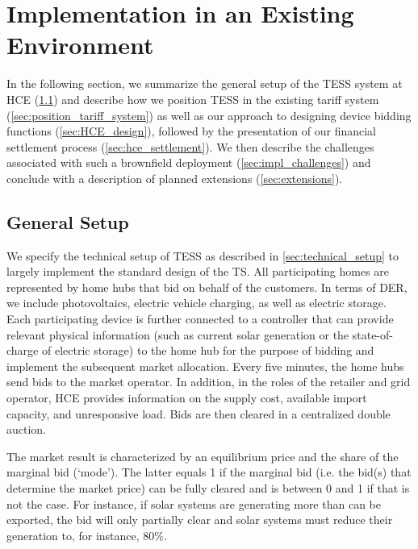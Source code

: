 \section{Implementation in an Existing Environment}\label{sec:challenges}

In the following section, we summarize the general setup of the TESS system at HCE (\cref{sec:hce_market_setup}) and describe how we position TESS in the existing tariff system (\cref{sec:position_tariff_system}) as well as our approach to designing device bidding functions (\cref{sec:HCE_design}), followed by the presentation of our financial settlement process (\cref{sec:hce_settlement}). We then describe the challenges associated with such a brownfield deployment (\cref{sec:impl_challenges}) and conclude with a description of planned extensions (\cref{sec:extensions}).

\subsection{General Setup}\label{sec:hce_market_setup}

We specify the technical setup of TESS as described in \cref{sec:technical_setup} to largely implement the standard design of the TS. All participating homes are represented by home hubs that bid on behalf of the customers. In terms of DER, we include photovoltaics, electric vehicle charging, as well as electric storage. Each participating device is further connected to a controller that can provide relevant physical information (such as current solar generation or the state-of-charge of electric storage) to the home hub for the purpose of bidding and implement the subsequent market allocation. Every five minutes, the home hubs send bids to the market operator. In addition, in the roles of the retailer and grid operator, HCE provides information on the supply cost, available import capacity, and unresponsive load. Bids are then cleared in a centralized double auction. 

The market result is characterized by an equilibrium price and the share of the marginal bid (`mode'). The latter equals 1 if the marginal bid (i.e. the bid(s) that determine the market price) can be fully cleared and is between 0 and 1 if that is not the case. For instance, if solar systems are generating more than can be exported, the bid will only partially clear and solar systems must reduce their generation to, for instance, 80\%.

